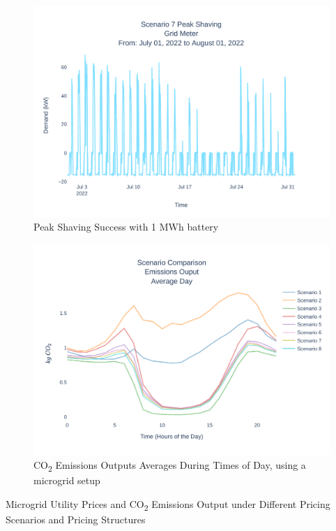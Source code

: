 \documentclass[conference]{IEEEtran}
\begin{document}
	\begin{figure}
		\centering
		\includegraphics[width=1\linewidth]{Fig/scenario_7_peak_shaving}
		\caption{Peak Shaving Success with 1 MWh battery}
		\label{fig:scenario4peakshaving}
	\end{figure}
	\begin{figure}
		\centering
		\includegraphics[width=1\linewidth]{Fig/emissions_scenario_comparison_run_3}
		\caption{CO\textsubscript{2} Emissions Outputs Averages During Times of Day, using a microgrid setup}
		\label{fig:emissionsscenariocomparison}
	\end{figure}
	\begin{table}
		\caption{Microgrid Utility Prices and CO\textsubscript{2} Emissions Output under Different Pricing Scenarios and Pricing Structures}
		\tiny
		\centering
		
		\normalsize
		\label{tab:emissions}
	\end{table}	
\end{document}
